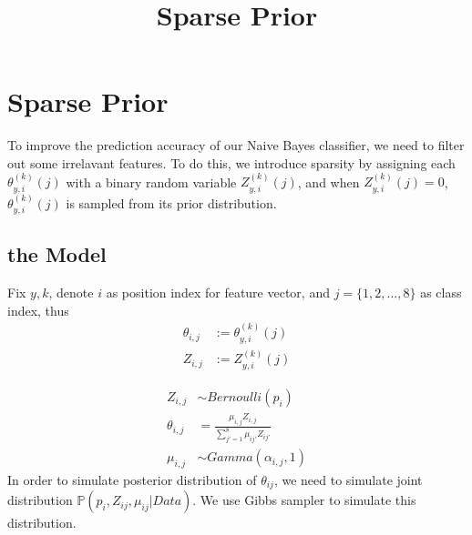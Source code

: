 \documentclass[12pt]{article}
\title{Sparse Prior}
\begin{document}
\maketitle

\section{Sparse Prior}
To improve the prediction accuracy of our Naive Bayes classifier, we need to filter out some irrelavant features. To do this, we introduce sparsity by assigning each $\theta_{y,i}^{(k)}(j)$ with a binary random variable $Z_{y,i}^{(k)}(j)$, and when $Z_{y,i}^{(k)}(j)=0$, $\theta_{y,i}^{(k)}(j)$ is sampled from its prior distribution.

\subsection{the Model}
Fix $y,k$, denote $i$ as position index for feature vector, and $j = \{1,2, \ldots,8\} $ as class index, thus
\begin{align*}
\theta_{i,j} &:= \theta_{y,i}^{(k)}(j) \\
Z_{i,j} &:= Z_{y,i}^{(k)}(j)
\end{align*}

\begin{align*}
Z_{i,j} &\sim Bernoulli (p_i) \\
\theta_{i,j} &= \frac{\mu_{i,j} Z_{i,j}}{\sum_{j'=1}^8 \mu_{ij'} Z_{ij'}} \\
\mu_{i,j} &\sim Gamma(\alpha_{i,j},1)
\end{align*}
In order to simulate posterior distribution of $\theta_{ij}$, we need to simulate joint distribution $\mathbb{P} (p_i, Z_{ij}, \mu_{ij} | Data)$. We use Gibbs sampler to simulate this distribution.
\end{document}
